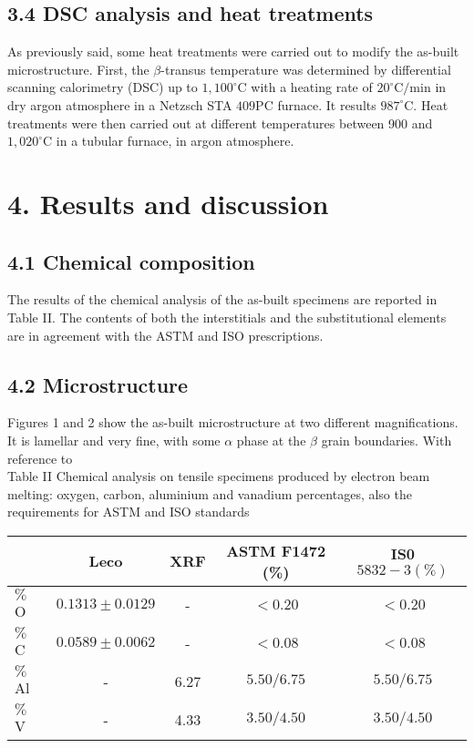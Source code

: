 \documentclass[10pt]{article}
\begin{document}
\subsection*{3.4 DSC analysis and heat treatments}
As previously said, some heat treatments were carried out to modify the as-built microstructure. First, the $\beta$-transus temperature was determined by differential scanning calorimetry (DSC) up to $1,100^{\circ} \mathrm{C}$ with a heating rate of $20^{\circ} \mathrm{C} / \mathrm{min}$ in dry argon atmosphere in a Netzsch STA $409 \mathrm{PC}$ furnace. It results $987^{\circ} \mathrm{C}$. Heat treatments were then carried out at different temperatures between 900 and $1,020^{\circ} \mathrm{C}$ in a tubular furnace, in argon atmosphere.

\section*{4. Results and discussion}
\subsection*{4.1 Chemical composition}
The results of the chemical analysis of the as-built specimens are reported in Table II. The contents of both the interstitials and the substitutional elements are in agreement with the ASTM and ISO prescriptions.

\subsection*{4.2 Microstructure}
Figures 1 and 2 show the as-built microstructure at two different magnifications. It is lamellar and very fine, with some $\alpha$ phase at the $\beta$ grain boundaries. With reference to\\
Table II Chemical analysis on tensile specimens produced by electron beam melting: oxygen, carbon, aluminium and vanadium percentages, also the requirements for ASTM and ISO standards

\begin{center}
\begin{tabular}{lcccc}
\hline
 & Leco & XRF & ASTM F1472 (\%) & IS0 $5832-3(\%)$ \\
\hline
$\%$ O & $0.1313 \pm 0.0129$ & - & $<0.20$ & $<0.20$ \\
$\%$ C & $0.0589 \pm 0.0062$ & - & $<0.08$ & $<0.08$ \\
$\%$ Al & - & 6.27 & $5.50 / 6.75$ & $5.50 / 6.75$ \\
$\%$ V & - & 4.33 & $3.50 / 4.50$ & $3.50 / 4.50$ \\
\hline
\end{tabular}
\end{center}
\end{document}

